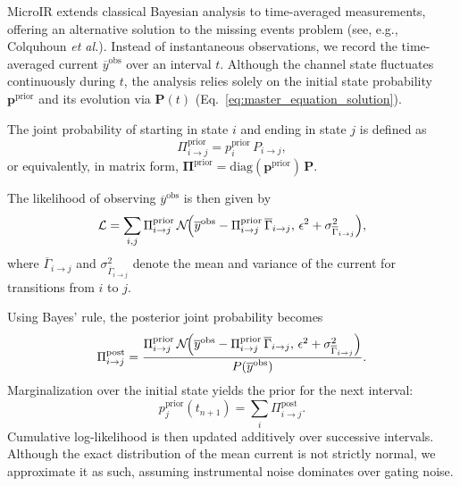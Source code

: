 \documentclass[pdflatex,sn-mathphys-num]{sn-jnl}%
\theoremstyle{thmstyleone}%
\theoremstyle{thmstyletwo}%
\theoremstyle{thmstylethree}%
\begin{document}
MicroIR extends classical Bayesian analysis to time-averaged measurements, offering an alternative solution to the missing events problem (see, e.g., Colquhoun \textit{et al.}). Instead of instantaneous observations, we record the time-averaged current \(\overline{y}^{\text{obs}}\) over an interval \(t\). Although the channel state fluctuates continuously during \(t\), the analysis relies solely on the initial state probability \(\boldsymbol{p}^{\text{prior}}\) and its evolution via \(\mathbf{P}(t)\) (Eq.~\ref{eq:master_equation_solution}).

The joint probability of starting in state \(i\) and ending in state \(j\) is defined as
\begin{equation}
	\Pi_{i\rightarrow j}^{\text{prior}} = p_i^{\text{prior}}\,P_{i\rightarrow j},
	\label{eq:joint_state_probability_short}
\end{equation}
or equivalently, in matrix form, \(\boldsymbol{\Pi}^{\text{prior}} = \mathrm{diag}(\boldsymbol{p}^{\text{prior}})\,\mathbf{P}\).

The likelihood of observing \(\overline{y}^{\text{obs}}\) is then given by
\begin{equation}
	\mathcal{L} = \sum_{i,j} \Pi_{i\rightarrow j}^{\text{prior}}\,\mathcal{N}\!\Bigl(\overline{y}^{\text{obs}} - \Pi_{i\rightarrow j}^{\text{prior}}\,\overline{\Gamma}_{i\rightarrow j},\, \epsilon^2 + \sigma^2_{\overline{\Gamma}_{i\rightarrow j}}\Bigr),
	\label{eq:integrated_likelihood_short}
\end{equation}
where \(\overline{\Gamma}_{i\rightarrow j}\) and \(\sigma^2_{\overline{\Gamma}_{i\rightarrow j}}\) denote the mean and variance of the current for transitions from \(i\) to \(j\).

Using Bayes' rule, the posterior joint probability becomes
\begin{equation}
	\Pi_{i\rightarrow j}^{\text{post}} = \frac{\Pi_{i\rightarrow j}^{\text{prior}}\,\mathcal{N}\!\Bigl(\overline{y}^{\text{obs}} - \Pi_{i\rightarrow j}^{\text{prior}}\,\overline{\Gamma}_{i\rightarrow j},\, \epsilon^2 + \sigma^2_{\overline{\Gamma}_{i\rightarrow j}}\Bigr)}{P(\overline{y}^{\text{obs}})}.
	\label{eq:integrated_posterior_short}
\end{equation}
Marginalization over the initial state yields the prior for the next interval:
\begin{equation}
	p_j^{\text{prior}}(t_{n+1}) = \sum_i \Pi_{i\rightarrow j}^{\text{post}}.
	\label{eq:next_prior_short}
\end{equation}
Cumulative log-likelihood is then updated additively over successive intervals. Although the exact distribution of the mean current is not strictly normal, we approximate it as such, assuming instrumental noise dominates over gating noise.
\end{document}

